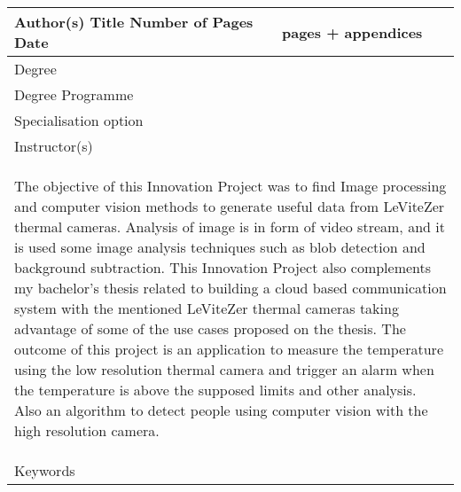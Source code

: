 \documentclass[hidelinks,11pt,a4paper,oneside,article]{memoir}
\begin{document}
\pagestyle{abstract}
\begin{tabular}{ | p{} | p{} |}
	\hline
	Author(s) \newline
	Title \newline\newline 
	Number of Pages \newline
	Date
	& 
	\makeatletter
	\@author \newline
	\@title \newline\newline
	\pageref*{LastPage} pages + \total{chapter} appendices \newline %
	\IfLanguageName {finnish} {\foreignlanguage{english}{\longdate\@date}} {\@date}
	\makeatother
	\\ \hline
	Degree & \metropoliadegree
	\\ \hline
	Degree Programme & \metropoliadegreeprogramme
	\\ \hline
	Specialisation option & \metropoliaspecialisation
	\\ \hline
	Instructor(s) & \metropoliainstructors
	\\ \hline
	\multicolumn{2}{|p{15cm}|}{\begin{singlespacing}\vspace{-22pt}
			The objective of this Innovation Project was to find Image processing and computer vision methods to generate useful data from LeViteZer thermal cameras. Analysis of image is in form of video stream, and it is used some image analysis techniques such as blob detection and background subtraction.\newline
			\newline
			This Innovation Project also complements my bachelor's thesis related to building a cloud based communication system with the mentioned LeViteZer thermal cameras taking advantage of some of the use cases proposed on the thesis.\newline
            \newline				
			The outcome of this project is an application to measure the temperature using the low resolution thermal camera and trigger an alarm when the temperature is above the supposed limits and other analysis. Also an algorithm to detect people using computer vision with the high resolution camera.
			
	\end{singlespacing}} \\[14cm] \hline
	Keywords & \metropoliakeywords
	\\ \hline
\end{tabular}
\clearpage
\end{document}
